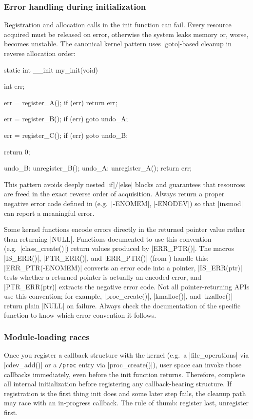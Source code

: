 \documentclass[10pt, oneside]{book}
\begin{document}
\subsubsection{Error handling during initialization}
\label{sec:init_error_handling}
Registration and allocation calls in the init function can fail.
Every resource acquired must be released on error, otherwise the system leaks memory or, worse, becomes unstable.
The canonical kernel pattern uses \cpp|goto|-based cleanup in reverse allocation order:

\begin{code}
static int __init my_init(void)
{
    int err;

    err = register_A();
    if (err)
        return err;

    err = register_B();
    if (err)
        goto undo_A;

    err = register_C();
    if (err)
        goto undo_B;

    return 0;

undo_B:
    unregister_B();
undo_A:
    unregister_A();
    return err;
}
\end{code}

This pattern avoids deeply nested \cpp|if|/\cpp|else| blocks and guarantees that resources are freed in the exact reverse order of acquisition.
Always return a proper negative error code defined in  (e.g.\ \cpp|-ENOMEM|, \cpp|-ENODEV|) so that \sh|insmod| can report a meaningful error.

Some kernel functions encode errors directly in the returned pointer value rather than returning \cpp|NULL|.
Functions documented to use this convention (e.g.\ \cpp|class_create()|) return values produced by \cpp|ERR_PTR()|.
The macros \cpp|IS_ERR()|, \cpp|PTR_ERR()|, and \cpp|ERR_PTR()| (from ) handle this:
\cpp|ERR_PTR(-ENOMEM)| converts an error code into a pointer,
\cpp|IS_ERR(ptr)| tests whether a returned pointer is actually an encoded error,
and \cpp|PTR_ERR(ptr)| extracts the negative error code.
Not all pointer-returning APIs use this convention; for example, \cpp|proc_create()|, \cpp|kmalloc()|, and \cpp|kzalloc()| return plain \cpp|NULL| on failure.
Always check the documentation of the specific function to know which error convention it follows.

\subsubsection{Module-loading races}
\label{sec:init_races}
Once you register a callback structure with the kernel (e.g.\ a \cpp|file_operations| via \cpp|cdev_add()| or a \verb|/proc| entry via \cpp|proc_create()|), user space can invoke those callbacks immediately, even before the init function returns.
Therefore, complete all internal initialization before registering any callback-bearing structure.
If registration is the first thing init does and some later step fails, the cleanup path may race with an in-progress callback.
The rule of thumb: register last, unregister first.
\end{document}
